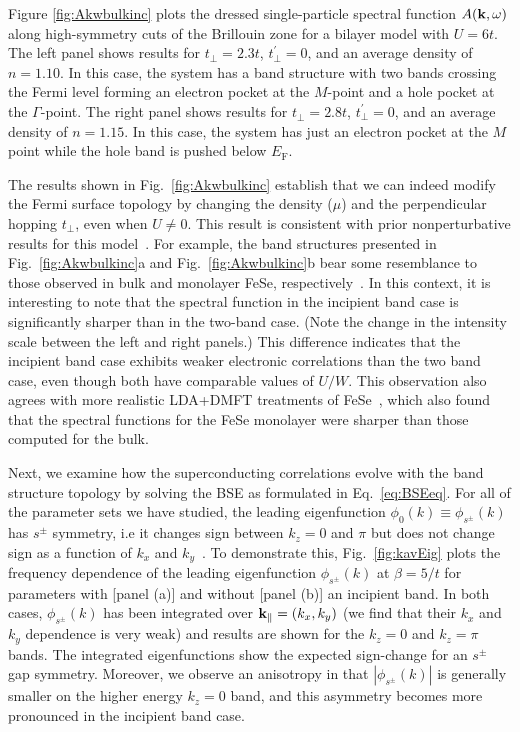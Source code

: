 \documentclass[prb,twocolumn,amsmath,amssymb,superscriptaddress,floatfix,nofootinbib]{revtex4-2}
\begin{document}
Figure \ref{fig:Akwbulkinc} plots the dressed single-particle spectral function $A({\bf k},\omega)$ along high-symmetry cuts of the Brillouin zone for a bilayer model with $U = 6t$. The left panel shows results for $t^{\phantom\prime}_\perp= 2.3t$, $t_\perp^{\prime}=0$, and an average density of $n=1.10$. In this case, the system has a band structure with two bands crossing the Fermi level forming an electron pocket at the $M$-point and a hole pocket at the $\Gamma$-point. The right panel shows results for $t^{\phantom\prime}_\perp= 2.8t$, $t_\perp^{\prime}=0$, and an average density of $n=1.15$. In this case, the system has just an electron pocket at the $M$ point while the hole band is pushed below $E_\mathrm{F}$. 

The results shown in Fig.~\ref{fig:Akwbulkinc} establish that we can indeed modify the Fermi surface topology by changing the density ($\mu$) and the perpendicular hopping $t_\perp$, even when $U \ne 0$. This result is consistent with prior nonperturbative results for this model~\cite{Maier2019, PelliciariRIXS2020}. For example, the band structures presented in Fig.~\ref{fig:Akwbulkinc}a and Fig.~\ref{fig:Akwbulkinc}b bear some resemblance to those observed in bulk and monolayer FeSe, respectively~\cite{PelliciariRIXS2020}. In this context, it is interesting to note that the spectral function in the incipient band case is significantly sharper than in the two-band case. (Note the change in the intensity scale between the left and right panels.) This difference indicates that the incipient band case exhibits weaker electronic correlations than the two band case, even though both have comparable values of $U/W$. This observation also agrees with more realistic LDA+DMFT treatments of FeSe~\cite{MandalPRL2017}, which also found that the spectral functions for the FeSe monolayer were sharper than those computed for the bulk.  

Next, we examine how the superconducting correlations evolve with the band structure topology by solving the BSE as formulated in Eq.~\eqref{eq:BSEeq}. For all of the parameter sets we have studied, the leading eigenfunction $\phi_0(k) \equiv \phi_{s^\pm}(k)$ has $s^\pm$ symmetry, i.e it changes sign between $k_z=0$ and $\pi$ but does not change sign as a function of $k_x$ and $k_y$~\cite{Maier2011, Maier2019}. To demonstrate this, Fig.~\ref{fig:kavEig} plots the frequency dependence of the leading eigenfunction $\phi_{s^\pm}(k)$ at $\beta = 5/t$ for parameters with [panel (a)] and without [panel (b)] an incipient band. In both cases, $\phi_{s^\pm}(k)$ has been integrated over ${\bf k}_\parallel = (k_x,k_y)$ (we find that their $k_x$ and $k_y$ dependence is very weak) and results are shown for the $k_z = 0$ and $k_z = \pi$ bands. The integrated eigenfunctions show the expected sign-change for an $s^\pm$ gap symmetry. Moreover, we observe an anisotropy in that $|\phi_{s^\pm}(k)|$ is generally smaller on the higher energy $k_z = 0$ band, and this asymmetry becomes more pronounced in the incipient band case. 
\end{document}
